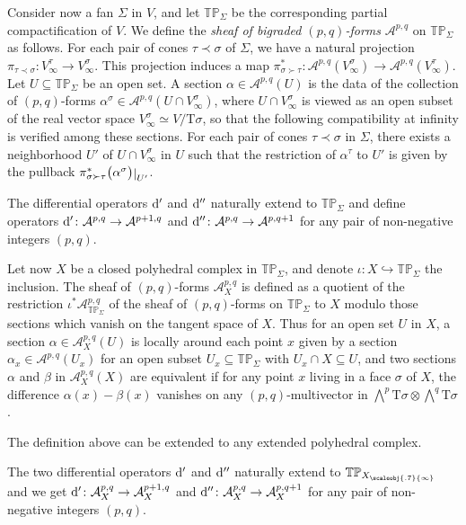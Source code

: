 \documentclass[11pt]{amsart}
\theoremstyle{definition}
\numberwithin{equation}{section}
\renewcommand{\~}{\widetilde}
\newcommand{\rquot}[2]{#1\big/#2}
\newcommand{\rest}[1]{\raisebox{-1pt}{$\vert$}_{#1}}
\let\oldbigwedge\bigwedge
\renewcommand{\bigwedge}{{\textstyle\oldbigwedge\!}}
\newcommand{\TP}{\mathbb{TP}} %
\newcommand{\TT}{\mathrm{T}} %
\renewcommand{\d}{{\rm d}} %
\newcommand{\sminfty}{{\scaleobj{.7}{\infty}}} %
\newcommand{\dip}{\d'}
\newcommand{\dis}{\d''}
\newcommand{\A}{\mathcal A} %
\newcommand{\subface}{\prec}
\newcommand{\supface}{\succ}
\begin{document}
\medskip

Consider now a fan $\Sigma$ in $V$, and let $\TP_\Sigma$ be the corresponding partial compactification of $V$. We define the  \emph{sheaf of bigraded $(p,q)$-forms} $\A^{p,q}$ on $\TP_\Sigma$ as follows. For each pair of cones $\tau\subface\sigma$ of $\Sigma$, we have a natural projection $\pi_{\tau\subface\sigma}\colon V^\tau_\infty \to V^\sigma_\infty$. This projection induces a map $\pi_{\sigma\supface\tau}^*\colon \A^{p,q}(V^\sigma_\infty)\to\A^{p,q}(V^\tau_\infty)$. Let $U \subseteq \TP_\Sigma$ be an open set. A section $\alpha \in \A^{p,q}(U)$ is the data of the collection of $(p,q)$-forms $\alpha^\sigma \in \A^{p,q}(U \cap V^{\sigma}_\infty)$, where $U \cap V^\sigma_\infty$ is viewed as an open subset of the real vector space $V^\sigma_\infty \simeq \rquot{V}{\TT\sigma}$, so that the following compatibility at infinity is verified among these sections. For each pair of cones $\tau\subface\sigma$ in $\Sigma$, there exists a neighborhood $U'$ of $U\cap V^\sigma_\infty$ in $U$ such that the restriction of $\alpha^\tau$ to $U'$ is given by the pullback ${\pi^*_{\sigma\supface\tau}} \bigl(\alpha^{\sigma}\bigr)\rest{U'}$.

The differential operators $\dip$ and $\dis$ naturally extend to $\TP_\Sigma$ and define operators $\dip\colon \A^{p, q}\to \A^{p+1, q}$ and $\dis\colon \A^{p, q} \to \A^{p, q+1}$ for any pair of non-negative integers $(p, q)$.

\medskip

Let now $X$ be a closed polyhedral complex in $\TP_\Sigma$, and denote $\iota\colon X  \hookrightarrow \TP_\Sigma$ the inclusion. The sheaf of $(p,q)$-forms $\A^{p,q}_X$ is defined as a quotient of the restriction $\iota^* \A^{p,q}_{\TP_\Sigma}$ of the sheaf of $(p,q)$-forms on $\TP_\Sigma$ to $X$ modulo those sections which vanish on the tangent space of $X$. Thus for an open set $U$ in $X$, a section $\alpha \in \A^{p,q}_X(U)$ is locally around each point $x$ given by a section $\alpha_x \in \A^{p,q}(U_x)$ for an open subset $U_x \subseteq \TP_\Sigma$ with $U_x \cap X  \subseteq U$, and two sections $\alpha$ and $\beta$ in $\A_X^{p,q}(X)$ are equivalent if for any point $x$ living in a face $\sigma$ of $X$, the difference $\alpha(x) - \beta(x)$ vanishes on any $(p,q)$-multivector in $\bigwedge^p \TT \sigma \otimes \bigwedge^q \TT \sigma$.

The definition above can be extended to any extended polyhedral complex.

The two differential operators $\dip$ and $\dis$ naturally extend to $\TP_{X_\sminfty}$ and we get $\dip\colon \A_X^{p, q}\to \A_X^{p+1, q}$ and $\dis\colon \A_X^{p, q} \to \A_X^{p, q+1}$ for any pair of non-negative integers $(p, q)$.
\end{document}
